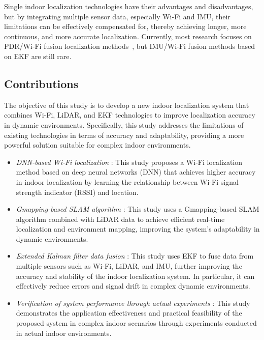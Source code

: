 \documentclass[12pt,a4paper]{article}
\numberwithin{equation}{section}
\begin{document}
Single indoor localization technologies have their advantages and disadvantages,
but by integrating multiple sensor data, especially Wi-Fi and IMU, their
limitations can be effectively compensated for, thereby achieving longer, more
continuous, and more accurate localization. Currently, most research focuses on
PDR/Wi-Fi fusion localization methods~\cite{liu2021kalman}, but IMU/Wi-Fi fusion
methods based on EKF are still rare.

\subsection{Contributions}
The objective of this study is to develop a new indoor localization system that
combines Wi-Fi, LiDAR, and EKF technologies to improve localization accuracy in
dynamic environments. Specifically, this study addresses the limitations of
existing technologies in terms of accuracy and adaptability, providing a more
powerful solution suitable for complex indoor environments.
\begin{itemize}
\item \textit{DNN-based Wi-Fi localization} : This study proposes a Wi-Fi
  localization method based on deep neural networks (DNN) that achieves higher
  accuracy in indoor localization by learning the relationship between Wi-Fi
  signal strength indicator (RSSI) and location.
    
\item \textit{Gmapping-based SLAM algorithm} : This study uses a Gmapping-based
  SLAM algorithm combined with LiDAR data to achieve efficient real-time
  localization and environment mapping, improving the system's adaptability in
  dynamic environments.
    
\item \textit{Extended Kalman filter data fusion} : This study uses EKF to fuse
  data from multiple sensors such as Wi-Fi, LiDAR, and IMU, further improving
  the accuracy and stability of the indoor localization system. In particular,
  it can effectively reduce errors and signal drift in complex dynamic
  environments.
    
\item \textit{Verification of system performance through actual experiments} :
  This study demonstrates the application effectiveness and practical
  feasibility of the proposed system in complex indoor scenarios through
  experiments conducted in actual indoor environments.
\end{itemize}
\end{document}
